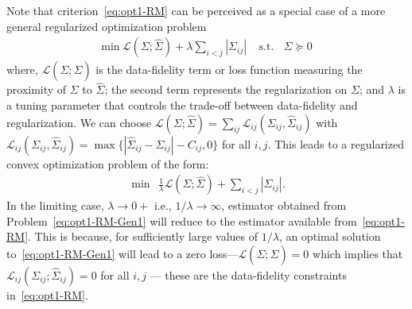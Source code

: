 Note that criterion~\eqref{eq:opt1-RM} 
can be perceived as a special case of a more general regularized optimization problem
\begin{equation}\label{eq:opt1-RM-Gen}
    \begin{aligned}
     \text{min} ~ {\mathcal L}(\Sigma; \hat{\Sigma}) +  \lambda \sum_{i<j} |\Sigma_{ij}|
    ~~~~~\text{s.t.}~~~~\Sigma \succeq 0
    \end{aligned}
\end{equation}
where, ${\mathcal L}(\Sigma; \hat{\Sigma})$ is the data-fidelity term or loss function measuring the proximity of $\Sigma$ to $\hat{\Sigma}$; the second term represents the regularization on $\Sigma$; and $\lambda$ is a tuning parameter that controls the trade-off between data-fidelity and regularization. We can choose ${\mathcal L}(\Sigma; \hat{\Sigma}) = \sum_{ij} {\mathcal L}_{ij}(\Sigma_{ij}, \hat{\Sigma}_{ij})$ with 
${\mathcal L}_{ij}(\Sigma_{ij}, \hat{\Sigma}_{ij})= \max \{| \hat{\Sigma}_{ij} - \Sigma_{ij} |  -  C_{ij}, 0\}$ for all $i,j$.
This leads to a regularized convex optimization problem of the form:
\begin{equation}\label{eq:opt1-RM-Gen1}
    \begin{aligned}\min~~ \frac{1}{\lambda}{\mathcal L}(\Sigma; \hat{\Sigma}) +  \sum_{i<j} |\Sigma_{ij}|.
    \end{aligned}
\end{equation}
In the limiting case, $\lambda\rightarrow 0+$ i.e., $1/\lambda \rightarrow \infty$, estimator obtained from Problem~\eqref{eq:opt1-RM-Gen1} will reduce to the estimator available from~\eqref{eq:opt1-RM}. This is because, for sufficiently large values of $1/\lambda$, 
an optimal solution to~\eqref{eq:opt1-RM-Gen1} will lead to a zero loss---${\mathcal L}(\Sigma; \hat{\Sigma}) = 0$ which implies that 
${\mathcal L}_{ij}(\Sigma_{ij}; \hat{\Sigma}_{ij}) = 0$ for all $i,j$ --- these are the data-fidelity constraints in~\eqref{eq:opt1-RM}.

